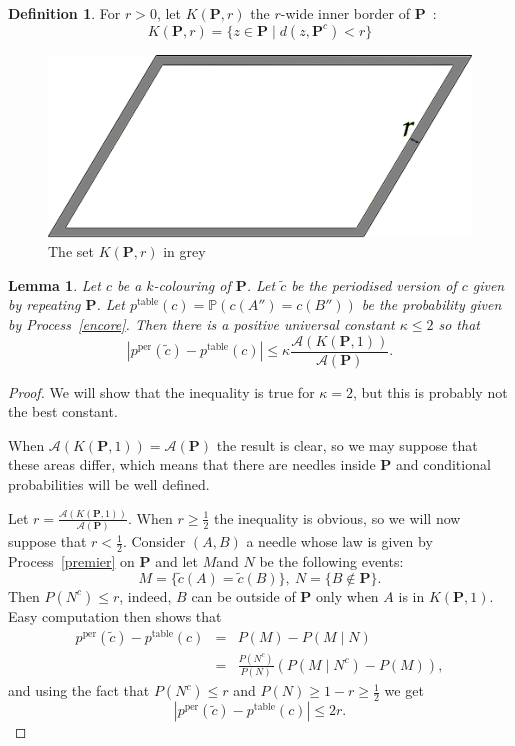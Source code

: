 \documentclass[a4paper,11pt]{article}
\newtheorem{lemma}{Lemma}
\theoremstyle{definition}
\newtheorem{definition}{Definition}
\theoremstyle{remark}
\renewcommand{\Pr}{\mathbb{P}}
\renewcommand{\P}{\mathbf{P}}
\newcommand{\pper}{p^{\mathrm{per}}}
\newcommand{\ptable}{p^{\mathrm{table}}}
\begin{document}
\begin{definition}
For $r>0$, let $K(\mathbf{P},r)$ the $r$-wide inner border of $\mathbf{P}$~:
\[K(\mathbf{P},r) = \{ z \in \mathbf{P} \mid d(z,\mathbf{P}^c) < r\} \] 
\end{definition}

\begin{figure}[h]
\center
\includegraphics[scale=0.5]{tablefinie.png}
\caption{\label{tablefinie} The set $K(\mathbf{P},r)$ in grey}
\end{figure}

\begin{lemma}\label{choco}
Let $c$ be a $k$-colouring of $\mathbf{P}$. Let $\tilde{c}$ be the periodised version of
$c$ given by repeating $\P$. Let
$\ptable(c) = \Pr(c(A'')=c(B''))$ be the probability given by Process~\ref{encore}. Then 
there is a positive universal constant $\kappa \leq 2$ so that 
$$ | \pper(\tilde{c}) - \ptable(c)| \leq \kappa \frac{\mathcal{A}(K(\mathbf{P},1))}{\mathcal{A}(\mathbf{P})}.$$
\end{lemma}

\begin{proof}
We will show that the inequality is true for $\kappa =2$, but this is probably 
not the best constant.

When $\mathcal{A}(K(\mathbf{P},1)) = \mathcal{A}(\mathbf{P})$ the result is clear,
so we may suppose that these areas differ, which means that there are needles 
inside $\P$ and conditional probabilities will be well defined.

Let $r = \frac{\mathcal{A}(K(\mathbf{P},1))}{\mathcal{A}(\mathbf{P})}$. When 
$r \geq \frac12$ the inequality is obvious, so we will now suppose that 
$r < \frac12$. Consider $(A,B)$ a needle whose law is given by Process~\ref{premier} on $\P$ and let $M$and $N$ be the following events:
$$ M = \{\tilde{c} (A) = \tilde{c} (B) \}, \ N = \{B\notin \P \}.$$
Then $P(N^c) \leq r$, indeed, $B$ can 
be outside of $\mathbf{P}$ only
when $A$ is in $K(\mathbf{P},1)$. Easy computation then shows that
\begin{eqnarray*}
\pper(\tilde{c}) - \ptable(c) & = & P(M) - P(M \mid N) \\
& = & \frac{P(N^c)}{P(N)} \left( P(M\mid N^c) - P(M)\right),
\end{eqnarray*}
and using the fact that $P(N^c) \leq r$ and 
$P(N) \geq 1-r \geq \frac12$ we get 
$$ |\pper(\tilde{c}) - \ptable(c)| \leq 2r.$$
\end{proof}
\end{document}
